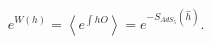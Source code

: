 \begin{equation}
e^{W(h)}=\left\langle e^{\int h O}\right\rangle=e^{-S_{AdS_5}(\hat h)}.
\label{n1}
\end{equation}

